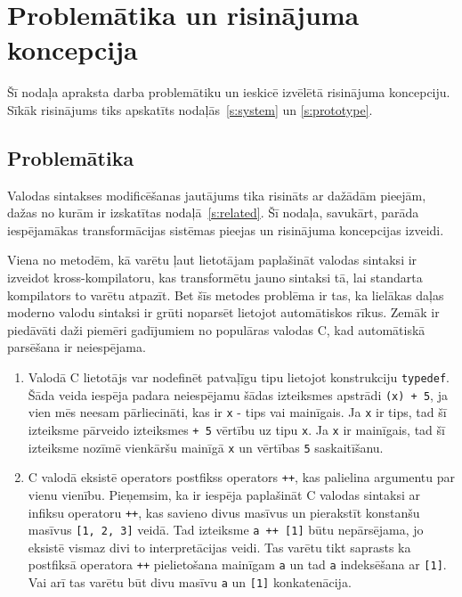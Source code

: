 \section{\label{s:motivation}Problemātika un risinājuma koncepcija}

Šī nodaļa apraksta darba problemātiku un ieskicē izvēlētā risinājuma koncepciju. Sīkāk risinājums tiks apskatīts nodaļās~\ref{s:system} un \ref{s:prototype}.

\subsection{Problemātika}

Valodas sintakses modificēšanas jautājums tika risināts ar dažādām pieejām, dažas no kurām ir izskatītas nodaļā~\ref{s:related}. Šī nodaļa, savukārt, parāda iespējamākas transformācijas sistēmas pieejas un risinājuma koncepcijas izveidi.

Viena no metodēm, kā varētu ļaut lietotājam paplašināt valodas sintaksi ir izveidot kross\--kom\-pi\-la\-to\-ru, kas transformētu jauno sintaksi tā, lai standarta kompilators to varētu atpazīt. Bet šīs metodes problēma ir tas, ka lielākas daļas moderno valodu sintaksi ir grūti noparsēt lietojot automātiskos rīkus. Zemāk ir piedāvāti daži piemēri gadījumiem no populāras valodas C, kad automātiskā parsēšana ir neiespējama.

\begin{enumerate}
\item
Valodā C lietotājs var nodefinēt patvaļīgu tipu lietojot konstrukciju \verb|typedef|. Šāda veida iespēja padara neiespējamu šādas izteiksmes apstrādi \verb|(x) + 5|, ja vien mēs neesam pārliecināti, kas ir \verb|x| - tips vai mainīgais. Ja \verb|x| ir tips, tad šī izteiksme pārveido izteiksmes \verb|+ 5| vērtību uz tipu \verb|x|. Ja \verb|x| ir mainīgais, tad šī izteiksme nozīmē vienkāršu mainīgā \verb|x| un vērtības \verb|5| saskaitīšanu. 
\item
C valodā eksistē operators postfikss operators \verb|++|, kas palielina argumentu par vienu vienību. Pieņemsim, ka ir iespēja paplašināt C valodas sintaksi ar infiksu operatoru \verb|++|, kas savieno divus masīvus un pierakstīt konstanšu masīvus \verb|[1, 2, 3]| veidā. Tad izteiksme \verb|a ++ [1]| būtu nepārsējama, jo eksistē vismaz divi to interpretācijas veidi. Tas varētu tikt saprasts ka postfiksā operatora \verb|++| pielietošana mainīgam \verb|a| un tad \verb|a| indeksēšana ar \verb|[1]|. Vai arī tas varētu būt divu masīvu \verb|a| un \verb|[1]| konkatenācija.
\end{enumerate}

